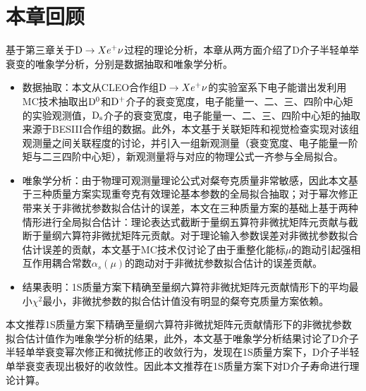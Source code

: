 \section{本章回顾}
基于第三章关于$\mathrm{D}\to X e^{+}\nu$过程的理论分析，本章从两方面介绍了D介子半轻单举衰变的唯象学分析，分别是数据抽取和唯象学分析。
\begin{itemize}
    \item [一] 数据抽取：本文从CLEO合作组$\mathrm{D}\to X e^{+}\nu$的实验室系下电子能谱出发利用MC技术抽取出$\mathrm{D}^0$和$\mathrm{D}^+$介子的衰变宽度，电子能量一、二、三、四阶中心矩的实验观测值，$\mathrm{D}_{\mathrm{s}}$介子的衰变宽度，电子能量一、二、三、四阶中心矩的抽取来源于BESIII合作组的数据。此外，本文基于关联矩阵和视觉检查实现对该组观测量之间关联程度的讨论，并引入一组新观测量（衰变宽度、电子能量一阶矩与二三四阶中心矩），新观测量将与对应的物理公式一齐参与全局拟合。
    \item [二] 唯象学分析：由于物理可观测量理论公式对粲夸克质量非常敏感，因此本文基于三种质量方案实现重夸克有效理论基本参数的全局拟合抽取；对于幂次修正带来关于非微扰参数拟合估计的误差，本文在三种质量方案的基础上基于两种情形进行全局拟合估计：理论表达式截断于量纲五算符非微扰矩阵元贡献与截断于量纲六算符非微扰矩阵元贡献。对于理论输入参数误差对非微扰参数拟合估计误差的贡献，本文基于MC技术仅讨论了由于重整化能标$\mu$的跑动引起强相互作用耦合常数$\alpha_s(\mu)$的跑动对于非微扰参数拟合估计的误差贡献。
    \item [三] 结果表明：1S质量方案下精确至量纲六算符非微扰矩阵元贡献情形下的平均最小$\chi^2$最小，非微扰参数的拟合估计值没有明显的粲夸克质量方案依赖。
\end{itemize}

本文推荐1S质量方案下精确至量纲六算符非微扰矩阵元贡献情形下的非微扰参数拟合估计值作为唯象学分析的结果，此外，本文基于唯象学分析结果讨论了D介子半轻单举衰变幂次修正和微扰修正的收敛行为，发现在1S质量方案下，D介子半轻单举衰变表现出极好的收敛性。因此本文推荐在1S质量方案下对D介子寿命进行理论计算。